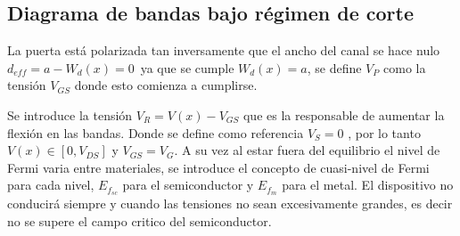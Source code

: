 \documentclass[a4paper]{article}
\begin{document}
\begin{figure}[H]
	
\end{figure}


\subsection{Diagrama de bandas bajo régimen de corte}

La puerta está polarizada tan inversamente que el ancho del canal se hace nulo $d_{eff} = a - W_d(x) = 0 \,$ ya que se cumple $W_d(x) = a$, se define $V_P$ como la tensión $V_{GS}$ donde esto comienza a cumplirse. 

Se introduce la tensión $V_R =  V(x) - V_{GS} $ que es la responsable de aumentar la flexión en las bandas. Donde se define como referencia $V_S = 0 $ , por lo tanto $V(x) \in [0 , V_{DS}]$ y $V_{GS} = V_{G}$. A su vez al estar fuera del equilibrio el nivel de Fermi varia entre materiales, se introduce el concepto de cuasi-nivel de Fermi para cada nivel, $E_{f_{sc}}$ para el semiconductor y $E_{f_{m}}$ para el metal. El dispositivo no conducirá siempre y cuando las tensiones no sean excesivamente grandes, es decir no se supere el campo critico del semiconductor. 
\end{document}
